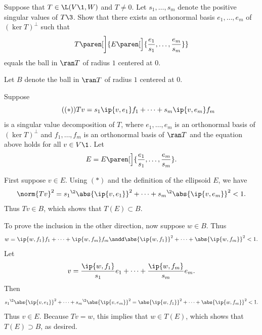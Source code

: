 \exercise
Suppose that $T \in \L(V\1,W)$ and $T \ne 0$. Let $s_1, \ldots, s_m$ denote the positive singular values of $T\3$. Show that there exists an orthonormal basis $e_1, \ldots, e_m$ of $(\ker T)^\perp$ such that
\[
T\paren[\bigg]{ E\paren[\Big]{ \frac{e_1}{s_1}, \ldots, \frac{e_m}{s_m} } }
\]
equals the ball in $\ran T$ of radius $1$ centered at $0$.

\begin{Solution}
Let $B$ denote the ball in $\ran T$ of radius $1$ centered at $0$.

Suppose
\[  \tag{$(*)$}
Tv = s_1 \ip{v, e_1} f_1 + \cdots + s_m \ip{v, e_m} f_m
\]
is a singular value decomposition of $T$, where $e_1, \ldots, e_m$ is an orthonormal basis of $(\ker T)^\perp$ and $f_1, \ldots, f_m$ is an orthonormal basis of $\ran T$ and the equation above holds for all $v \in V\1$. Let
\[
E = E\paren[\Big]{ \frac{e_1}{s_1}, \ldots, \frac{e_m}{s_m} }.
\]

First suppose $v \in E$. Using $(*)$ and the definition of the ellipsoid $E$, we have
\[
\norm{Tv}^2 = {s_1}^{\2} \abs{\ip{v, e_1}}^2 + \cdots + {s_m}^{\2} \abs{\ip{v, e_m}}^2 < 1.
\]
Thus $Tv \in B$, which shows that $T(E) \subset B$.

To prove the inclusion in the other direction, now suppose $w \in B$. Thus
\[
w = \ip{w, f_1}f_1 + \cdots + \ip{w, f_m}f_m \andd \abs{\ip{w, f_1}}^2 + \cdots + \abs{\ip{w, f_m}}^2 < 1.
\]
Let
\[
v = \frac{\ip{w,f_1}}{s_1} e_1  + \cdots +  \frac{\ip{w,f_m}}{s_m} e_m.
\]
Then
\[
{s_1}^{\2} \abs{\ip{v, e_1}}^2 + \cdots + {s_m}^{\2} \abs{\ip{v, e_m}}^2
= \abs{\ip{w, f_1}}^2 + \cdots + \abs{\ip{w, f_m}}^2 <1.
\]
Thus $v \in E$. Because $Tv = w$, this implies that $w \in T(E)$, which shows that $T(E) \supset B$, as desired.
\end{Solution}

